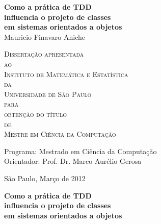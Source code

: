 \documentclass[11pt,openany,twoside,a4paper]{book}
\begin{document}
\frontmatter 
\fancyhead[RO]{{\footnotesize\rightmark}\hspace{2em}\thepage}
\setcounter{tocdepth}{2}
\fancyhead[LE]{\thepage\hspace{2em}\footnotesize{\leftmark}}
\fancyhead[RE,LO]{}
\fancyhead[RO]{{\footnotesize\rightmark}\hspace{2em}\thepage}

\onehalfspacing  %

\thispagestyle{empty}
\begin{center}
    \vspace*{2.3cm}
    \textbf{\Large{Como a prática de TDD \\influencia o projeto de classes \\em sistemas orientados a objetos}}\\
    
    \vspace*{1.2cm}
    \Large{Mauricio Finavaro Aniche}
    
    \vskip 2cm
    \textsc{
    Dissertação apresentada\\[-0.25cm] 
    ao\\[-0.25cm]
    Instituto de Matemática e Estatística\\[-0.25cm]
    da\\[-0.25cm]
    Universidade de São Paulo\\[-0.25cm]
    para\\[-0.25cm]
    obtenção do título\\[-0.25cm]
    de\\[-0.25cm]
    Mestre em Ciência da Computação}
    
    \vskip 1.5cm
    Programa: Mestrado em Ciência da Computação\\
    Orientador: Prof. Dr. Marco Aurélio Gerosa

   	\vskip 1.5cm
    \normalsize{São Paulo, Março de 2012}
\end{center}

\newpage
\thispagestyle{empty}
    \begin{center}
        \vspace*{2.3 cm}
        \textbf{\Large{Como a prática de TDD \\influencia o projeto de classes \\em sistemas orientados a objetos}}\\
        \vspace*{2 cm}
    \end{center}
\end{document}
